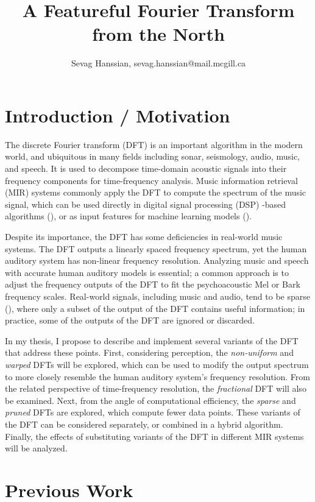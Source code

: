 \documentclass[letter,12pt]{scrartcl}
\title{A Featureful Fourier Transform from the North}
\author{Sevag Hanssian, sevag.hanssian@mail.mcgill.ca}
\begin{document}
\maketitle

\section{Introduction / Motivation}

The discrete Fourier transform (DFT) is an important algorithm in the modern world, and ubiquitous in many fields including sonar, seismology, audio, music, and speech. It is used to decompose time-domain acoustic signals into their frequency components for time-frequency analysis. Music information retrieval (MIR) systems commonly apply the DFT to compute the spectrum of the music signal, which can be used directly in digital signal processing (DSP) -based algorithms (\cite{fitzgerald}), or as input features for machine learning models (\cite{musicnn1}).

Despite its importance, the DFT has some deficiencies in real-world music systems. The DFT outputs a linearly spaced frequency spectrum, yet the human auditory system has non-linear frequency resolution. Analyzing music and speech with accurate human auditory models is essential; a common approach is to adjust the frequency outputs of the DFT to fit the psychoacoustic Mel or Bark frequency scales. Real-world signals, including music and audio, tend to be sparse (\cite{sparse}), where only a subset of the output of the DFT contains useful information; in practice, some of the outputs of the DFT are ignored or discarded.

In my thesis, I propose to describe and implement several variants of the DFT that address these points. First, considering perception, the \textit{non-uniform} and \textit{warped} DFTs will be explored, which can be used to modify the output spectrum to more closely resemble the human auditory system's frequency resolution. From the related perspective of time-frequency resolution, the \textit{fractional} DFT will also be examined. Next, from the angle of computational efficiency, the \textit{sparse} and \textit{pruned} DFTs are explored, which compute fewer data points. These variants of the DFT can be considered separately, or combined in a hybrid algorithm. Finally, the effects of substituting variants of the DFT in different MIR systems will be analyzed.

\section{Previous Work}
\end{document}
